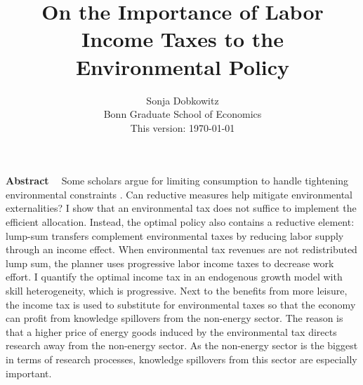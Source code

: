 \documentclass[12pt]{article}
\title{On the Importance of Labor Income Taxes to the  Environmental Policy}
\date{Sonja Dobkowitz\\ Bonn Graduate School of Economics\\ %
\vspace{1mm}
This version: \today }
\renewenvironment{abstract}
{\small
	\list{}{
		\setlength{\leftmargin}{0.025\textwidth}%
		\setlength{\rightmargin}{\leftmargin}%
	}%
	\item\relax}
{\endlist}
\begin{document}
%	
	\maketitle
	\begin{abstract}
		\begin{singlespacing}
			\textbf{Abstract \ }
			Some scholars argue for limiting consumption to handle tightening environmental constraints \citep{Schor2005SustainableReductionb, VanVuuren2018AlternativeTechnologies}. Can reductive measures help mitigate environmental externalities?
			 I show that an environmental tax does not suffice to implement the efficient allocation. Instead, the optimal policy also contains a reductive element: lump-sum transfers complement environmental taxes by reducing labor supply through an income effect.
			 When environmental tax revenues are not redistributed lump sum, the planner uses progressive labor income taxes to decrease work effort. %
			I quantify the optimal income tax in an endogenous growth model with skill heterogeneity, which is progressive. Next to the benefits from more leisure, the income tax is used to substitute for environmental taxes so that the economy can profit from knowledge spillovers from the  non-energy sector. The reason is that a higher price of energy goods induced by the environmental tax directs research away from the non-energy sector. As the non-energy sector is the biggest in terms of research processes, knowledge spillovers from this sector are especially important.%


\end{singlespacing}
\end{abstract}
\end{document}
